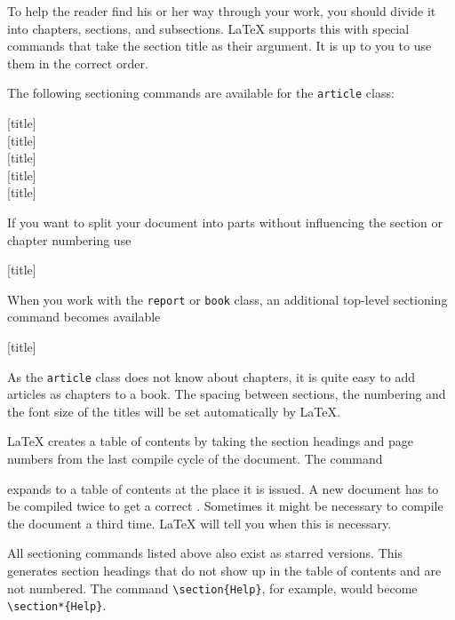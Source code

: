 To help the reader find his or her way through your work, you should
divide it into chapters, sections, and subsections.  \LaTeX{} supports
this with special commands that take the section title as their
argument.  It is up to you to use them in the correct order.

The following sectioning commands are available for the
\texttt{article} class: \nopagebreak

\begin{lscommand}
  [title]\\
  [title]\\
  [title]\\
  [title]\\
  [title]
\end{lscommand}

If you want to split your document into parts without influencing the
section or chapter numbering use
\begin{lscommand}
  [title]
\end{lscommand}

When you work with the \texttt{report} or \texttt{book} class,
an additional top-level sectioning command becomes available
\begin{lscommand}
  [title]
\end{lscommand}

As the \texttt{article} class does not know about chapters, it is quite easy
to add articles as chapters to a book.
The spacing between sections, the numbering and the font size of the
titles will be set automatically by \LaTeX.

\LaTeX{} creates a table of contents by taking the section headings
and page numbers from the last compile cycle of the document. The command
\begin{lscommand}
\end{lscommand}
\noindent expands to a table of contents at the place it is issued. A new
document has to be compiled twice to get a correct .
Sometimes it might be necessary to compile the document a third time. \LaTeX{}
will tell you when this is necessary.

All sectioning commands listed above also exist as starred versions. This
generates section headings that do not show up in the table of contents and are
not numbered. The command \verb|\section{Help}|, for example, would become
\verb|\section*{Help}|.

